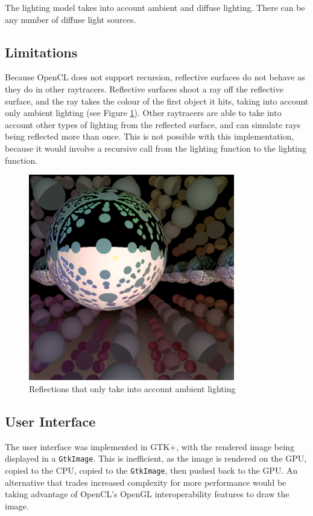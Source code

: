\documentclass{article}
\begin{document}
The lighting model takes into account ambient and diffuse lighting. There can be any number of diffuse light sources.

\subsection{Limitations}
Because OpenCL does not support recursion, reflective surfaces do not behave as they do in other raytracers. Reflective surfaces shoot a ray off the reflective surface, and the ray takes the colour of the first object it hits, taking into account only ambient lighting (see Figure \ref{fig:reflections}). Other raytracers are able to take into account other types of lighting from the reflected surface, and can simulate rays being reflected more than once. This is not possible with this implementation, because it would involve a recursive call from the lighting function to the lighting function.

\begin{figure}[ht!]
\centering
\includegraphics[width=90mm]{reflections.png}
\caption{Reflections that only take into account ambient lighting}
\label{fig:reflections}
\end{figure}

\subsection{User Interface}
The user interface was implemented in GTK+, with the rendered image being displayed in a \texttt{GtkImage}. This is inefficient, as the image is rendered on the GPU, copied to the CPU, copied to the \texttt{GtkImage}, then pushed back to the GPU. An alternative that trades increased complexity for more performance would be taking advantage of OpenCL's OpenGL interoperability features to draw the image.
\end{document}
